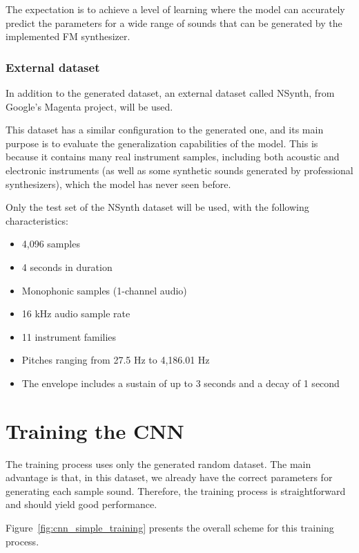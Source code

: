 \documentclass[sigconf,natbib=false]{acmart}
\begin{document}
The expectation is to achieve a level of learning where the model can accurately predict the parameters for a wide range of sounds that can be generated by the implemented FM synthesizer.

\subsubsection{External dataset}

In addition to the generated dataset, an external dataset called NSynth, from Google's Magenta project, will be used.

This dataset has a similar configuration to the generated one, and its main purpose is to evaluate the generalization capabilities of the model. This is because it contains many real instrument samples, including both acoustic and electronic instruments (as well as some synthetic sounds generated by professional synthesizers), which the model has never seen before.

Only the test set of the NSynth dataset will be used, with the following characteristics:

\begin{itemize}
\item 4,096 samples
\item 4 seconds in duration
\item Monophonic samples (1-channel audio)
\item 16 kHz audio sample rate
\item 11 instrument families
\item Pitches ranging from 27.5 Hz to 4,186.01 Hz
\item The envelope includes a sustain of up to 3 seconds and a decay of 1 second
\end{itemize}

\section{Training the CNN}

The training process uses only the generated random dataset. The main advantage is that, in this dataset, we already have the correct parameters for generating each sample sound. Therefore, the training process is straightforward and should yield good performance.

Figure~\ref{fig:cnn_simple_training} presents the overall scheme for this training process.
\end{document}
